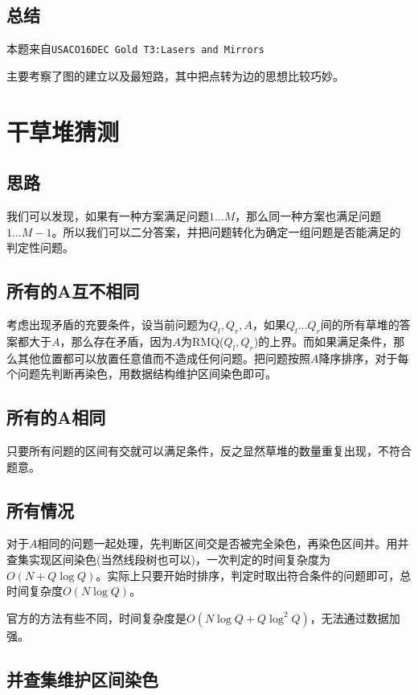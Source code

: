 \documentclass[hyperref,UTF8,12pt,a4paper]{ctexart}
\begin{document}
\subsection{总结}

本题来自\verb|USACO16DEC Gold T3:Lasers and Mirrors|

主要考察了图的建立以及最短路，其中把点转为边的思想比较巧妙。

\section{干草堆猜测}

\subsection{思路}

我们可以发现，如果有一种方案满足问题$1\dots M$，那么同一种方案也满足问题$1\dots M-1$。所以我们可以二分答案，并把问题转化为确定一组问题是否能满足的判定性问题。

\subsection{所有的A互不相同}

考虑出现矛盾的充要条件，设当前问题为$Q_l,Q_r,A$，如果$Q_l\dots Q_r$间的所有草堆的答案都大于$A$，那么存在矛盾，因为$A$为RMQ($Q_l,Q_r$)的上界。而如果满足条件，那么其他位置都可以放置任意值而不造成任何问题。把问题按照$A$降序排序，对于每个问题先判断再染色，用数据结构维护区间染色即可。

\subsection{所有的A相同}

只要所有问题的区间有交就可以满足条件，反之显然草堆的数量重复出现，不符合题意。

\subsection{所有情况}

对于$A$相同的问题一起处理，先判断区间交是否被完全染色，再染色区间并。用并查集实现区间染色(当然线段树也可以)，一次判定的时间复杂度为$O(N+Q\log Q)$。实际上只要开始时排序，判定时取出符合条件的问题即可，总时间复杂度$O(N\log Q)$。

官方的方法有些不同，时间复杂度是$O(N\log Q+Q\log^2 Q)$，无法通过数据加强。

\subsection{并查集维护区间染色}
\end{document}
